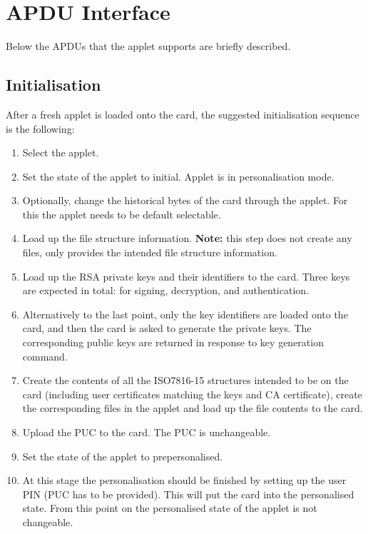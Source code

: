 \documentclass{article}
\begin{document}
\section{APDU Interface}

Below the APDUs that the applet supports are briefly described.

\subsection{Initialisation}

After a fresh applet is loaded onto the card, the suggested
initialisation sequence is the following:
\begin{enumerate}
  \item Select the applet.
  \item Set the state of the applet to \textsf{initial}. Applet is in
    personalisation mode.
  \item Optionally, change the historical bytes of the card through
    the applet. For this the applet needs to be default selectable.
  \item Load up the file structure information. \textbf{Note:} this
    step does not create any files, only provides the intended file
    structure information.
  \item Load up the RSA private keys and their identifiers to the
    card. Three keys are expected in total: for signing, decryption,
    and authentication.
  \item Alternatively to the last point, only the key identifiers are loaded
    onto the card, and then the card is asked to generate the private keys.
    The corresponding public keys are returned in response to key 
    generation command.
  \item Create the contents of all the ISO7816-15 structures intended
    to be on the card (including user certificates matching the keys
    and CA certificate), create the corresponding files in the applet
    and load up the file contents to the card.
  \item Upload the PUC to the card. The PUC is unchangeable.
  \item Set the state of the applet to \textsf{prepersonalised}.
  \item At this stage the personalisation should be finished by
    setting up the user PIN (PUC has to be provided).  This will put
    the card into the \textsf{personalised} state. From this point on
    the personalised state of the applet is not changeable.
\end{enumerate}
\end{document}
